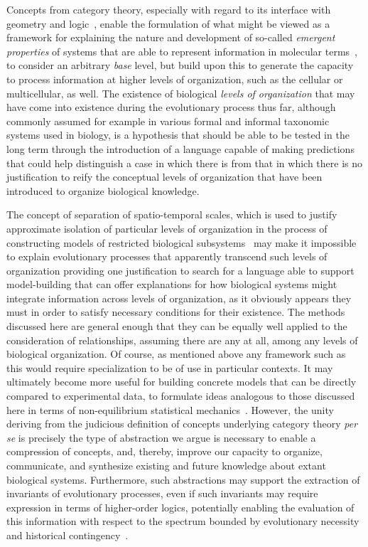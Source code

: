 \documentclass[aps,twocolumn]{revtex4-1}
\begin{document}
Concepts from category theory, especially with regard to its interface with geometry and logic~\cite{MacLane1992,Jacobs1998}, enable the formulation of what might be viewed as a framework for explaining the nature and development of so-called \emph{emergent properties} of systems that are able to represent information in molecular terms~\cite{Harmer2010}, to consider an arbitrary {\it base} level, but build upon this to generate the capacity to process information at higher levels of organization, such as the cellular or multicellular, as well. The existence of biological {\it levels of organization} that may have come into existence during the evolutionary process thus far, although commonly assumed for example in various formal and informal taxonomic systems used in biology, is a hypothesis that should be able to be tested in the long term through the introduction of a language capable of making predictions that could help distinguish a case in which there is from that in which there is no justification to reify the conceptual levels of organization that have been introduced to organize biological knowledge.

The concept of separation of spatio-temporal scales, which is used to justify approximate isolation of particular levels of organization in the process of constructing models of restricted biological subsystems~\cite{Gunawardena2012,Karr2012} may make it impossible to explain evolutionary processes that apparently transcend such levels of organization providing one justification to search for a language able to support model-building that can offer explanations for how biological systems might integrate information across levels of organization, as it obviously appears they must in order to satisfy necessary conditions for their existence. The methods discussed here are general enough that they can be equally well applied to the consideration of relationships, assuming there are any at all, among any levels of biological organization. Of course, as mentioned above any framework such as this would require specialization to be of use in particular contexts. It may ultimately become more useful for building concrete models that can be directly compared to experimental data, to formulate ideas analogous to those discussed here in terms of non-equilibrium statistical mechanics~\cite{Ellis1985,Freidlin1998,Touchette2009,Smith2011}. However, the unity deriving from the judicious definition of concepts underlying category theory {\it per se} is precisely the type of abstraction we argue is necessary to enable a compression of concepts, and, thereby, improve our capacity to organize, communicate, and synthesize existing and future knowledge about extant biological systems. Furthermore, such abstractions may support the extraction of invariants of evolutionary processes, even if such invariants may require expression in terms of higher-order logics, potentially enabling the evaluation of this information with respect to the spectrum bounded by evolutionary necessity and historical contingency~\cite{Fontana1994,Fontana1994a,Fontana1996}.
\end{document}
